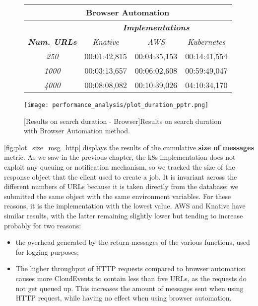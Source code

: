 \documentclass[../thesis.tex]{subfiles}
\begin{document}
\begin{figure}[H]
    \centering
    \begin{tabular}{|c|c|c|c|}
        \hline
        \multicolumn{4}{|c|}{\textbf{Browser Automation}} \\
        \hline
        & \multicolumn{3}{c|}{\textit{\textbf{Implementations}}} \\
        \hline
        \textit{\textbf{Num. URLs}} & \multicolumn{1}{c|}{\textit{Knative}} & \multicolumn{1}{c|}{\textit{AWS}} & \multicolumn{1}{c|}{\textit{Kubernetes}} \\
        \hline
        \textit{250} & 00:01:42,815 & 00:04:35,153 & 00:14:41,554 \\
        \hline
        \textit{1000} & 00:03:13,657 & 00:06:02,608 & 00:59:49,047 \\
        \hline
        \textit{4000}  & 00:08:08,082 & 00:10:39,026 & 04:10:34,170 \\
        \hline
    \end{tabular}
    
    \vspace{\floatsep}

    \texttt{[image: performance\_analysis/plot\_duration\_pptr.png]}

    [Results on search duration - Browser]{Results on search duration with Browser Automation method.}\label{fig:plot_duration_pptr}
\end{figure}

\newpage

\autoref{fig:plot_size_msg_http} displays the results of the cumulative \textbf{size of messages} metric. As we saw in the previous chapter, the \gls{k8s} implementation does not exploit any queuing or notification mechanism, so we tracked the size of the response object that the client used to create a \gls{job}. It is invariant across the different numbers of \acrshort{URL}s because it is taken directly from the database; we submitted the same object with the same environment variables. For these reasons, it is the implementation with the lowest value. AWS and Knative have similar results, with the latter remaining slightly lower but tending to increase probably for two reasons:

\begin{itemize}
    \item the overhead generated by the return messages of the various functions, used for logging purposes;
    \item The higher throughput of \acrshort{HTTP} requests compared to browser automation causes more CloudEvents to contain less than five \acrshort{URL}s, as the requests do not get queued up. This increases the amount of messages sent when using \acrshort{HTTP} request, while having no effect when using browser automation.
\end{itemize}
\end{document}
